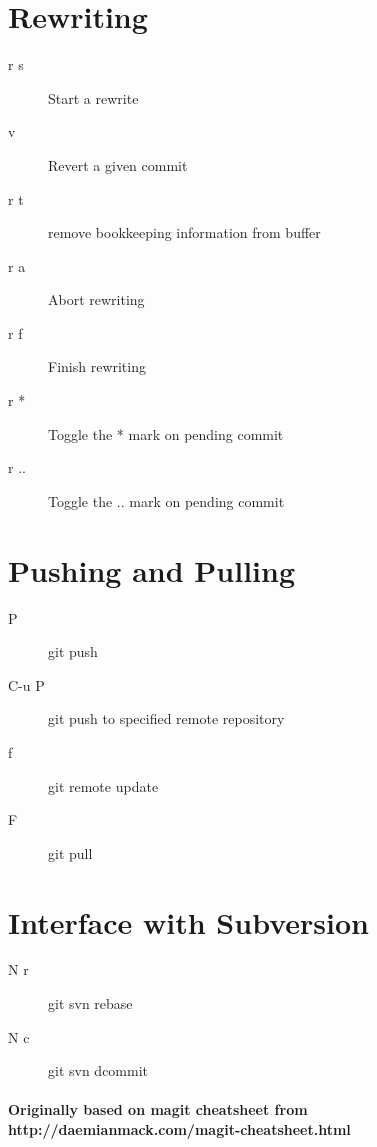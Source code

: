 \documentclass[11pt,a4paper]{article}
\begin{document}
\begin{multicols}{2}
\section{Rewriting}
\begin{description}
\item[r s] Start a rewrite
\item[v] Revert a given commit
\item[r t] remove bookkeeping information from buffer
\item[r a] Abort rewriting
\item[r f] Finish rewriting
\item[r *] Toggle the * mark on pending commit
\item[r ..] Toggle the .. mark on pending commit
\end{description}

\section{Pushing and Pulling}
\begin{description}
\item[P] git push
\item[C-u P] git push to specified remote repository
\item[f] git remote update
\item[F] git pull
\end{description}

\section{Interface with Subversion}
\begin{description}
\item[N r] git svn rebase
\item[N c] git svn dcommit
\end{description}

\end{multicols}

\paragraph{Originally based on magit cheatsheet from
  http://daemianmack.com/magit-cheatsheet.html}
\end{document}
